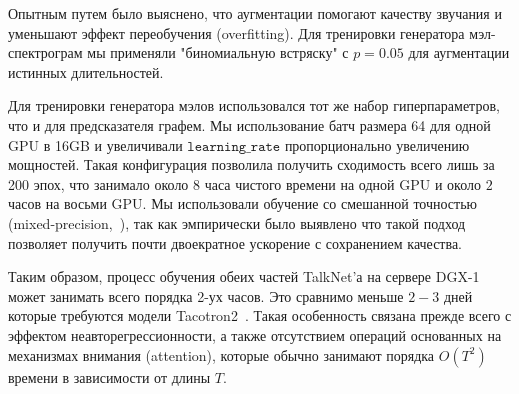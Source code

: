 Опытным путем было выяснено, что аугментации помогают качеству звучания и уменьшают эффект переобучения (overfitting). Для тренировки генератора мэл-спектрограм мы применяли "биномиальную встряску" с $p=0.05$ для аугментации истинных длительностей.

Для тренировки генератора мэлов использовался тот же набор гиперпараметров, что и для предсказателя графем. Мы использование батч размера 64 для одной GPU в 16GB и увеличивали $\texttt{learning\_rate}$ пропорционально увеличению мощностей. Такая конфигурация позволила получить сходимость всего лишь за 200 эпох, что занимало около $8$ часа чистого времени на одной GPU и около $2$ часов на восьми GPU. Мы использовали обучение со смешанной точностью (mixed-precision,~\cite{micikevicius}), так как эмпирически было выявлено что такой подход позволяет получить почти двоекратное ускорение с сохранением качества.

Таким образом, процесс обучения обеих частей TalkNet'а на сервере DGX-1 может занимать всего порядка 2-ух часов. Это сравнимо меньше $2-3$ дней которые требуются модели Tacotron2~\cite{tacotron2}. Такая особенность связана прежде всего с эффектом неавторегрессионности, а также отсутствием операций основанных на механизмах внимания (attention), которые обычно занимают порядка $O(T^2)$ времени в зависимости от длины $T$.